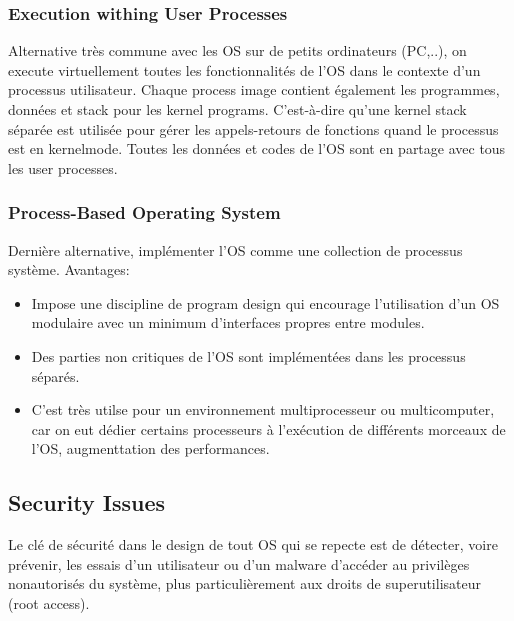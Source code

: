 \subsubsection{Execution withing User Processes}
\label{sec:uproc}
Alternative très commune avec les OS sur de petits ordinateurs (PC,..), on execute virtuellement toutes les fonctionnalités de l'OS dans le contexte d'un processus utilisateur. Chaque process image contient également les programmes, données et stack pour les kernel programs. C'est-à-dire qu'une kernel stack séparée est utilisée pour gérer les appels-retours de fonctions quand le processus est en kernelmode. Toutes les données et codes de l'OS sont en partage avec tous les user processes.

\subsubsection{Process-Based Operating System}
Dernière alternative, implémenter l'OS comme une collection de processus système.
Avantages:
\begin{itemize}
  \item Impose une discipline de program design qui encourage l'utilisation d'un OS modulaire avec un minimum d'interfaces propres entre modules.
  \item Des parties non critiques de l'OS sont implémentées dans les processus séparés.
  \item C'est très utilse pour un environnement multiprocesseur ou multicomputer, car on eut dédier certains processeurs à l'exécution de différents morceaux de l'OS, augmenttation des performances.
\end{itemize}

\subsection{Security Issues}
Le clé de sécurité dans le design de tout OS qui se repecte est de détecter, voire prévenir, les essais d'un utilisateur ou d'un malware d'accéder au privilèges nonautorisés du système, plus particulièrement aux droits de superutilisateur (root access).

